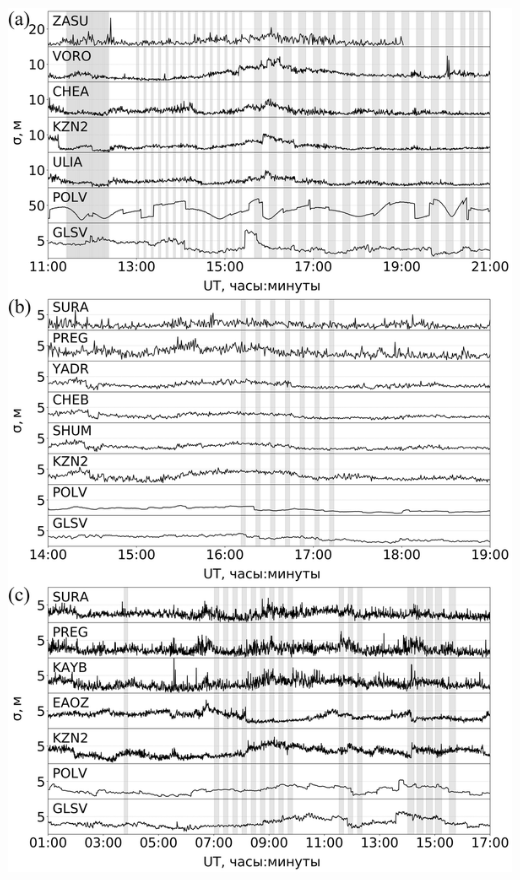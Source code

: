 \begin{landscape}
\begin{frame}
\includegraphics[width=0.93\paperheight]{../fig/l1c-sura.png}      
\end{frame}
\end{landscape}


